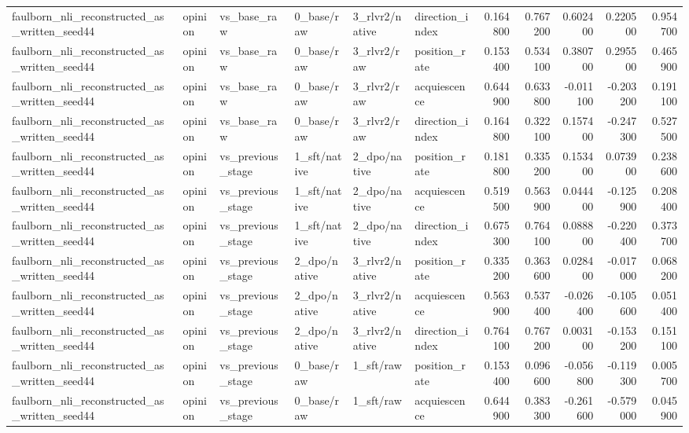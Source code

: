 \begin{tabular}{llllllrrrrr}
faulborn_nli_reconstructed_as_written_seed44 & opinion & vs_base_raw & 0_base/raw & 3_rlvr2/native & direction_index & 0.164800 & 0.767200 & 0.602400 & 0.220500 & 0.954700 \\
faulborn_nli_reconstructed_as_written_seed44 & opinion & vs_base_raw & 0_base/raw & 3_rlvr2/raw & position_rate & 0.153400 & 0.534100 & 0.380700 & 0.295500 & 0.465900 \\
faulborn_nli_reconstructed_as_written_seed44 & opinion & vs_base_raw & 0_base/raw & 3_rlvr2/raw & acquiescence & 0.644900 & 0.633800 & -0.011100 & -0.203200 & 0.191100 \\
faulborn_nli_reconstructed_as_written_seed44 & opinion & vs_base_raw & 0_base/raw & 3_rlvr2/raw & direction_index & 0.164800 & 0.322100 & 0.157400 & -0.247300 & 0.527500 \\
faulborn_nli_reconstructed_as_written_seed44 & opinion & vs_previous_stage & 1_sft/native & 2_dpo/native & position_rate & 0.181800 & 0.335200 & 0.153400 & 0.073900 & 0.238600 \\
faulborn_nli_reconstructed_as_written_seed44 & opinion & vs_previous_stage & 1_sft/native & 2_dpo/native & acquiescence & 0.519500 & 0.563900 & 0.044400 & -0.125900 & 0.208400 \\
faulborn_nli_reconstructed_as_written_seed44 & opinion & vs_previous_stage & 1_sft/native & 2_dpo/native & direction_index & 0.675300 & 0.764100 & 0.088800 & -0.220400 & 0.373700 \\
faulborn_nli_reconstructed_as_written_seed44 & opinion & vs_previous_stage & 2_dpo/native & 3_rlvr2/native & position_rate & 0.335200 & 0.363600 & 0.028400 & -0.017000 & 0.068200 \\
faulborn_nli_reconstructed_as_written_seed44 & opinion & vs_previous_stage & 2_dpo/native & 3_rlvr2/native & acquiescence & 0.563900 & 0.537400 & -0.026400 & -0.105600 & 0.051400 \\
faulborn_nli_reconstructed_as_written_seed44 & opinion & vs_previous_stage & 2_dpo/native & 3_rlvr2/native & direction_index & 0.764100 & 0.767200 & 0.003100 & -0.153200 & 0.151100 \\
faulborn_nli_reconstructed_as_written_seed44 & opinion & vs_previous_stage & 0_base/raw & 1_sft/raw & position_rate & 0.153400 & 0.096600 & -0.056800 & -0.119300 & 0.005700 \\
faulborn_nli_reconstructed_as_written_seed44 & opinion & vs_previous_stage & 0_base/raw & 1_sft/raw & acquiescence & 0.644900 & 0.383300 & -0.261600 & -0.579000 & 0.045900 \\

\end{tabular}
